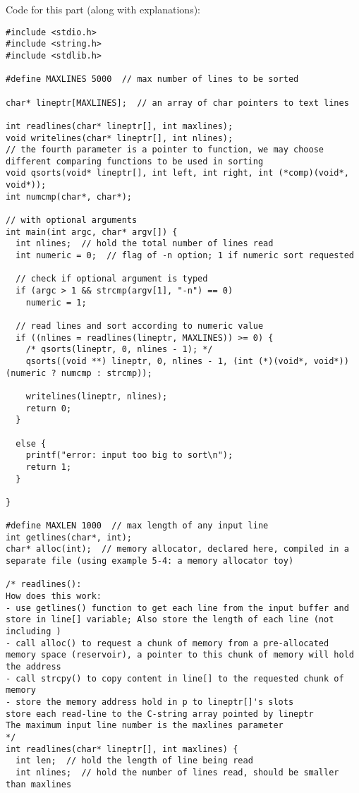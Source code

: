 \documentclass[12pt]{article}
\begin{document}
Code for this part (along with explanations):
\begin{verbatim}
#include <stdio.h>
#include <string.h>
#include <stdlib.h>

#define MAXLINES 5000  // max number of lines to be sorted

char* lineptr[MAXLINES];  // an array of char pointers to text lines

int readlines(char* lineptr[], int maxlines);
void writelines(char* lineptr[], int nlines);
// the fourth parameter is a pointer to function, we may choose different comparing functions to be used in sorting 
void qsorts(void* lineptr[], int left, int right, int (*comp)(void*, void*));
int numcmp(char*, char*);

// with optional arguments
int main(int argc, char* argv[]) {
  int nlines;  // hold the total number of lines read
  int numeric = 0;  // flag of -n option; 1 if numeric sort requested 

  // check if optional argument is typed
  if (argc > 1 && strcmp(argv[1], "-n") == 0)
    numeric = 1;

  // read lines and sort according to numeric value
  if ((nlines = readlines(lineptr, MAXLINES)) >= 0) {
    /* qsorts(lineptr, 0, nlines - 1); */
    qsorts((void **) lineptr, 0, nlines - 1, (int (*)(void*, void*))(numeric ? numcmp : strcmp));

    writelines(lineptr, nlines);
    return 0;
  }

  else {
    printf("error: input too big to sort\n");
    return 1;
  }

}

#define MAXLEN 1000  // max length of any input line
int getlines(char*, int);
char* alloc(int);  // memory allocator, declared here, compiled in a separate file (using example 5-4: a memory allocator toy)

/* readlines(): 
How does this work:
- use getlines() function to get each line from the input buffer and store in line[] variable; Also store the length of each line (not including )
- call alloc() to request a chunk of memory from a pre-allocated memory space (reservoir), a pointer to this chunk of memory will hold the address
- call strcpy() to copy content in line[] to the requested chunk of memory
- store the memory address hold in p to lineptr[]'s slots
store each read-line to the C-string array pointed by lineptr
The maximum input line number is the maxlines parameter
*/
int readlines(char* lineptr[], int maxlines) {
  int len;  // hold the length of line being read 
  int nlines;  // hold the number of lines read, should be smaller than maxlines


\end{verbatim}
\end{document}
